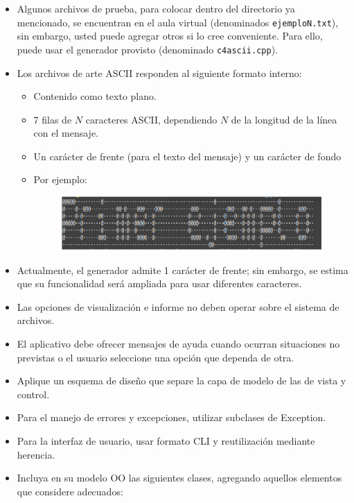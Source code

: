 \documentclass[a4paper,12pt]{article}
\begin{document}
\begin{itemize}
    \item Algunos archivos de prueba, para colocar dentro del directorio ya mencionado, se encuentran en el aula virtual (denominados \texttt{ejemploN.txt}), sin embargo, usted puede agregar otros si lo cree conveniente. Para ello, puede usar el generador provisto (denominado \texttt{c4ascii.cpp}).
    \item Los archivos de arte ASCII responden al siguiente formato interno:
    \begin{itemize}
        \item Contenido como texto plano.
        \item 7 filas de \(N\) caracteres ASCII, dependiendo \(N\) de la longitud de la línea con el mensaje.
        \item Un carácter de frente (para el texto del mensaje) y un carácter de fondo
        \item Por ejemplo:
        
        \begin{figure}[!h]
        \includegraphics[width = \textwidth]{C4/Ejemplo_consigna.PNG}
        \end{figure}
        
    \end{itemize}
    \item Actualmente, el generador admite 1 carácter de frente; sin embargo, se estima que su funcionalidad será ampliada para usar diferentes caracteres.
    \item Las opciones de visualización e informe no deben operar sobre el sistema de archivos.
    \item El aplicativo debe ofrecer mensajes de ayuda cuando ocurran situaciones no previstas o el usuario seleccione una opción que dependa de otra.
    \item Aplique un esquema de diseño que separe la capa de modelo de las de vista y control.
    \item Para el manejo de errores y excepciones, utilizar subclases de Exception.
    \item Para la interfaz de usuario, usar formato CLI y reutilización mediante herencia.
    \item Incluya en su modelo OO las siguientes clases, agregando aquellos elementos que considere adecuados:
\end{itemize}
\end{document}
